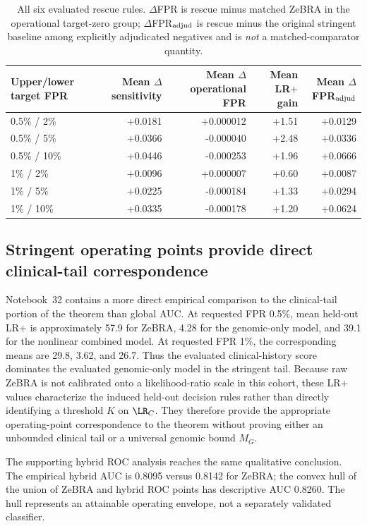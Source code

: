 {\figBoundaryRescue

\begin{table}[!t]
\caption{All six evaluated rescue rules. $\Delta$FPR is rescue minus matched ZeBRA in the operational target-zero group; $\Delta$FPR$_{\rm adjud}$ is rescue minus the original stringent baseline among explicitly adjudicated negatives and is \emph{not} a matched-comparator quantity.}
\label{tab:boundary-selected}\centering\footnotesize
\begin{tabular}{lrrrr}
\toprule
Upper/lower target FPR & Mean $\Delta$sensitivity & Mean $\Delta$operational FPR & Mean LR$+$ gain & Mean $\Delta$FPR$_{\rm adjud}$\\
\midrule
0.5\% / 2\% & +0.0181 & +0.000012 & +1.51 & +0.0129\\
0.5\% / 5\% & +0.0366 & -0.000040 & +2.48 & +0.0336\\
0.5\% / 10\% & +0.0446 & -0.000253 & +1.96 & +0.0666\\
1\% / 2\% & +0.0096 & +0.000007 & +0.60 & +0.0087\\
1\% / 5\% & +0.0225 & -0.000184 & +1.33 & +0.0294\\
1\% / 10\% & +0.0335 & -0.000178 & +1.20 & +0.0624\\
\bottomrule
\end{tabular}
\end{table}

\subsection{Stringent operating points provide direct clinical-tail correspondence}
Notebook~32 contains a more direct empirical comparison to the clinical-tail portion of the theorem than global AUC. At requested FPR 0.5\%, mean held-out LR$+$ is approximately 57.9 for ZeBRA, 4.28 for the genomic-only model, and 39.1 for the nonlinear combined model. At requested FPR 1\%, the corresponding means are 29.8, 3.62, and 26.7. Thus the evaluated clinical-history score dominates the evaluated genomic-only model in the stringent tail. Because raw ZeBRA is not calibrated onto a likelihood-ratio scale in this cohort, these LR$+$ values characterize the induced held-out decision rules rather than directly identifying a threshold $K$ on $\LR_C$. They therefore provide the appropriate operating-point correspondence to the theorem without proving either an unbounded clinical tail or a universal genomic bound $M_G$.

The supporting hybrid ROC analysis reaches the same qualitative conclusion. The empirical hybrid AUC is 0.8095 versus 0.8142 for ZeBRA; the convex hull of the union of ZeBRA and hybrid ROC points has descriptive AUC 0.8260. The hull represents an attainable operating envelope, not a separately validated classifier.

}
